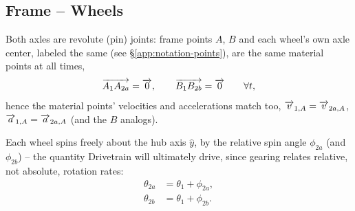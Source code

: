 \subsection{Frame -- Wheels}
\label{sec:frame-wheels}
Both axles are revolute (pin) joints: frame points $A$, $B$ and each wheel's own axle center, labeled the same (see \S\ref{app:notation-points}), are the same material points at all times,
\begin{equation}
    \overrightarrow{A_1A_{2a}} = \overrightarrow{0}, \qquad \overrightarrow{B_1B_{2b}} = \overrightarrow{0} \qquad \forall t,
\end{equation}
hence the material points' velocities and accelerations match too, $\overrightarrow{v}_{1,A}=\overrightarrow{v}_{2a,A}$, $\overrightarrow{a}_{1,A}=\overrightarrow{a}_{2a,A}$ (and the $B$ analogs).

Each wheel spins freely about the hub axis $\hat y$, by the relative spin angle $\phi_{2a}$ (and $\phi_{2b}$) -- the quantity Drivetrain will ultimately drive, since gearing relates relative, not absolute, rotation rates:
\begin{align}
    \theta_{2a} &= \theta_1 + \phi_{2a}, \\
    \theta_{2b} &= \theta_1 + \phi_{2b}.
\end{align}
